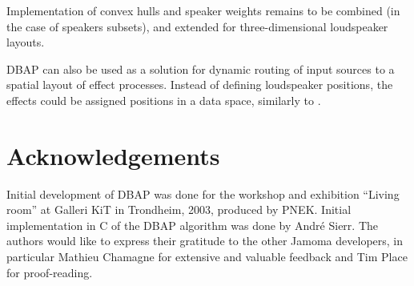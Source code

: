 \documentclass[twoside,10pt]{article}
\begin{document}
Implementation of convex hulls and speaker weights remains to be combined (in the case of speakers subsets), and extended for three-dimensional loudspeaker layouts. 


DBAP can also be used as a solution for dynamic routing of input sources to a spatial layout of effect processes. Instead of defining loudspeaker positions, the effects could be assigned positions in a data space, similarly to
\cite{Momeni:2003hipnoscope}. 


\section{Acknowledgements}

Initial development of DBAP was done for the workshop and exhibition ``Living room'' at Galleri KiT in Trondheim, 2003, produced by PNEK. Initial implementation in C of the DBAP algorithm was done by Andr\'e Sierr. The authors would like to express their gratitude to the other Jamoma developers, in particular Mathieu Chamagne for extensive and valuable feedback and Tim Place for proof-reading. 




\end{document}
